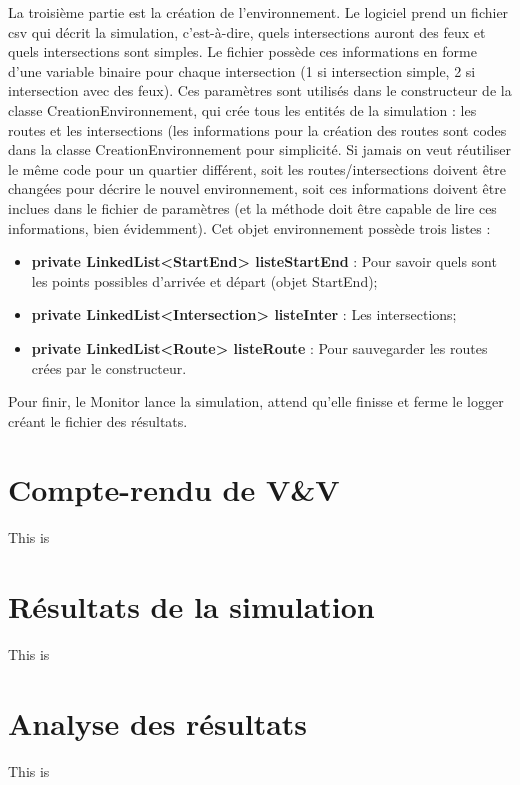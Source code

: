 \documentclass[12pt]{article} %
\begin{document}
La troisième partie est la création de l'environnement. Le logiciel prend un fichier csv qui décrit la simulation, c'est-à-dire, quels intersections auront des feux et quels intersections sont simples. Le fichier possède ces informations en forme d'une variable binaire pour chaque intersection (1 si intersection simple, 2 si intersection avec des feux).
%
Ces paramètres sont utilisés dans le constructeur de la classe CreationEnvironnement, qui crée tous les entités de la simulation : les routes et les intersections (les informations pour la création des routes sont codes dans la classe CreationEnvironnement pour simplicité. Si jamais on veut réutiliser le même code pour un quartier différent, soit les routes/intersections doivent être changées pour décrire le nouvel environnement, soit ces informations doivent être inclues dans le fichier de paramètres (et la méthode doit être capable de lire ces informations, bien évidemment).
%
Cet objet environnement possède trois listes :
\begin{itemize}
\item \textbf{private LinkedList<StartEnd> listeStartEnd} : Pour savoir quels sont les points possibles d'arrivée et départ (objet StartEnd);

\item \textbf{private LinkedList<Intersection> listeInter} : Les intersections;

\item \textbf{private LinkedList<Route> listeRoute} : Pour sauvegarder les routes crées par le constructeur.
\end{itemize}

Pour finir, le Monitor lance la simulation, attend qu'elle finisse et ferme le logger créant le fichier des résultats.

\newpage
\section{Compte-rendu de V\&V}\label{VV}
This is

\newpage
\section{Résultats de la simulation}\label{resultats-sim}
This is

\newpage
\section{Analyse des résultats}\label{resultats-analyse}
This is
\end{document}
